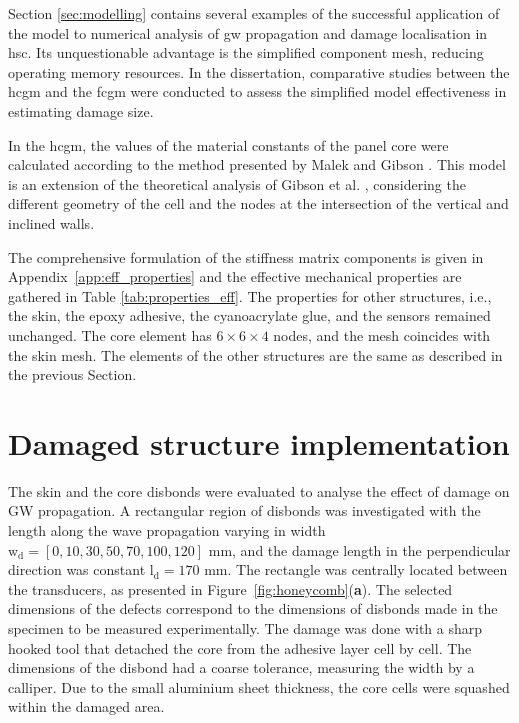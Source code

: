 \documentclass[11pt,a4paper,final]{report}
\theoremstyle{plain}
\begin{document}
Section \ref{sec:modelling} contains several examples of the successful application of the model to numerical analysis of \ac{gw} propagation and damage localisation in \ac{hsc}.
Its unquestionable advantage is the simplified component mesh, reducing operating memory resources.
In the dissertation, comparative studies between the \ac{hcgm} and the \ac{fcgm} were conducted to assess the simplified model effectiveness in estimating damage size.

In the \ac{hcgm}, the values of the material constants of the panel core were calculated according to the method presented by Malek and Gibson \cite{malek2015effective}.
This model is an extension of the theoretical analysis of Gibson et al. \cite{gibson1982mechanics}, considering the different geometry of the cell and the nodes at the intersection of the vertical and inclined walls.

The comprehensive formulation of the stiffness matrix components is given in Appendix~\ref{app:eff_properties} and the effective mechanical properties are gathered in Table \ref{tab:properties_eff}.
The properties for other structures, i.e., the skin, the epoxy adhesive, the cyanoacrylate glue, and the sensors remained unchanged.
The core element has \(6 \times 6 \times 4\) nodes, and the mesh coincides with the skin mesh.
The elements of the other structures are the same as described in the previous Section. \section{Damaged structure implementation}
\label{sec:disbond}
The skin and the core disbonds were evaluated to analyse the effect of damage on GW propagation.
A rectangular region of disbonds was investigated with the length along the wave propagation varying in width \(\mathrm{w_d} = [0,10,30,50,70,100,120]\) mm, and the damage length in the perpendicular direction was constant \(\mathrm{l_d} = 170\) mm.
The rectangle was centrally located between the transducers, as presented in Figure~\ref{fig:honeycomb}(\textbf{a}).
The selected dimensions of the defects correspond to the dimensions of disbonds made in the specimen to be measured experimentally.
The damage was done with a sharp hooked tool that detached the core from the adhesive layer cell by cell.
The dimensions of the disbond had a coarse tolerance, measuring the width by a calliper.
Due to the small aluminium sheet thickness, the core cells were squashed within the damaged area.
\end{document}
